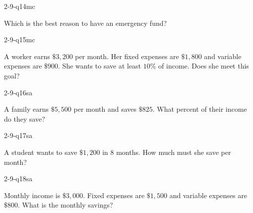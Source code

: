 \begin{practiceQuestion}{2-9-q14}{mc}
\begin{questionText}
Which is the best reason to have an emergency fund?
\end{questionText}
\end{practiceQuestion}

\begin{practiceQuestion}{2-9-q15}{mc}
\begin{questionText}
A worker earns $\$3{,}200$ per month. Her fixed expenses are $\$1{,}800$ and variable expenses are $\$900$. She wants to save at least $10\%$ of income. Does she meet this goal?
\end{questionText}
\end{practiceQuestion}


\begin{practiceQuestion}{2-9-q16}{sa}
\begin{questionText}
A family earns $\$5{,}500$ per month and saves $\$825$. What percent of their income do they save?
\end{questionText}
\end{practiceQuestion}

\begin{practiceQuestion}{2-9-q17}{sa}
\begin{questionText}
A student wants to save $\$1{,}200$ in $8$ months. How much must she save per month?
\end{questionText}
\end{practiceQuestion}

\begin{practiceQuestion}{2-9-q18}{sa}
\begin{questionText}
Monthly income is $\$3{,}000$. Fixed expenses are $\$1{,}500$ and variable expenses are $\$800$. What is the monthly savings?
\end{questionText}
\end{practiceQuestion}

